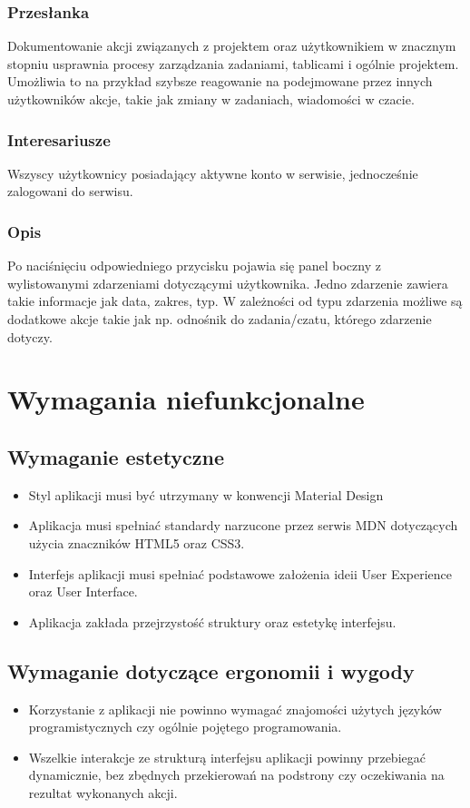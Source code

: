 \documentclass[eng,printmode]{mgr}
\begin{document}
\subsubsection{Przesłanka}
Dokumentowanie akcji związanych z projektem oraz użytkownikiem w znacznym stopniu usprawnia procesy zarządzania zadaniami, tablicami i ogólnie projektem. Umożliwia to na przykład szybsze reagowanie na podejmowane przez innych użytkowników akcje, takie jak zmiany w zadaniach, wiadomości w czacie.

\subsubsection{Interesariusze}
Wszyscy użytkownicy posiadający aktywne konto w serwisie, jednocześnie zalogowani do serwisu.

\subsubsection{Opis}
Po naciśnięciu odpowiedniego przycisku pojawia się panel boczny z wylistowanymi zdarzeniami dotyczącymi użytkownika. Jedno zdarzenie zawiera takie informacje jak data, zakres, typ. W zależności od typu zdarzenia możliwe są dodatkowe akcje takie jak np. odnośnik do zadania/czatu, którego zdarzenie dotyczy.

\section{Wymagania niefunkcjonalne}
\subsection{Wymaganie estetyczne}
\begin{itemize}
  \item Styl aplikacji musi być utrzymany w konwencji Material Design\cite{Material}
  \item Aplikacja musi spełniać standardy narzucone przez serwis MDN\cite{MDN_HTML}\cite{MDN_CSS} dotyczących użycia znaczników HTML5 oraz CSS3.
  \item Interfejs aplikacji musi spełniać podstawowe założenia ideii User Experience oraz User Interface\cite{Keyword_UserInterface}.
  \item Aplikacja zakłada przejrzystość struktury oraz estetykę interfejsu.
\end{itemize} 

\subsection{Wymaganie dotyczące ergonomii i wygody}
\begin{itemize}
  \item Korzystanie z aplikacji nie powinno wymagać znajomości użytych języków programistycznych czy ogólnie pojętego programowania.
  \item Wszelkie interakcje ze strukturą interfejsu aplikacji powinny przebiegać dynamicznie, bez zbędnych przekierowań na podstrony  czy oczekiwania na rezultat wykonanych akcji.
\end{itemize}
\end{document}
